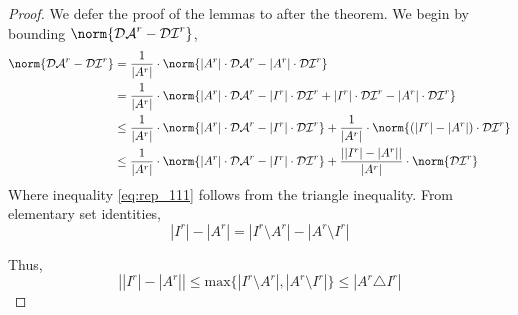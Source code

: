 \begin{proof}


We defer the proof of the lemmas to after the theorem. We begin by bounding $\norm{\mathcal{DA}^r-\mathcal{DI}^{r}}$,
\begin{align}
\norm{\mathcal{DA}^r-\mathcal{DI}^{r}} 
& =\frac{1}{|A^r|} \cdot  \norm{|A^r|\cdot \mathcal{DA}^r-|A^r|\cdot \mathcal{DI}^{r}} \nonumber \\ 
& =\frac{1}{|A^r|} \cdot  \norm{|A^r|\cdot \mathcal{DA}^r-|I^r|\cdot \mathcal{DI}^r+|I^r|\cdot \mathcal{DI}^r-|A^r|\cdot \mathcal{DI}^{r}} \nonumber \\ 
& \leq \frac{1}{|A^r|} \cdot \norm{|A^r|\cdot \mathcal{DA}^r-|I^{r}|\cdot \mathcal{DI}^{r}}+\frac{1}{|A^r|}\cdot \norm{(|I^r|-|A^{r}|)\cdot \mathcal{DI}^{r}} \label{eq:rep_111}\\
& \leq \frac{1}{|A^r|} \cdot \norm{|A^r|\cdot \mathcal{DA}^r-|I^{r}|\cdot \mathcal{DI}^{r}}+\frac{\left ||I^r|-|A^{r}|\right |}{|A^r|}\cdot \norm{\mathcal{DI}^{r}} \label{eq:rep_222}
\end{align}
Where inequality \ref{eq:rep_111} follows from the triangle inequality. 
From elementary set identities, 
\begin{equation}
|I^{r}|-|A^r|=|I^r\setminus A^r|-|A^r\setminus I^r|
\end{equation}

Thus, 
\begin{equation}\label{eq:rep_diff}
\left||I^{r}|-|A^r|\right|\leq \text{max}\{|I^r\setminus A^r|,|A^r\setminus I^r|\}\leq |A^r\triangle I^r|
\end{equation}


\end{proof}
